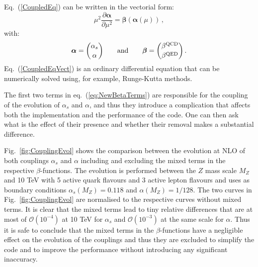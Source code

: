 Eq.~(\ref{CoupledEq}) can be written in the vectorial form:
\begin{equation}\label{CoupledEqVect}
\mu^2\frac{\partial {\bm \alpha}}{\partial \mu^2} = {\bm \beta}\left({\bm \alpha}(\mu)\right)\,,
\end{equation}
with:
\begin{equation}
  {\bm \alpha} = {\alpha_s \choose \alpha}\qquad\mbox{and}\qquad  {\bm \beta} = {\beta^{\rm QCD} \choose \beta^{\rm QED}}\,.
\end{equation}
Eq.~(\ref{CoupledEqVect}) is an ordinary differential equation that
can be numerically solved using, for example, Runge-Kutta methods.

The first two terms in eq.~(\ref{eq:NewBetaTerms}) are responsible for
the coupling of the evolution of $\alpha_s$ and $\alpha$, and thus they
introduce a complication that affects both the implementation and the
performance of the code.
%
One can then ask what is the effect of their
presence and whether their removal makes a substantial difference. 

Fig.~\ref{fig:CouplingEvol} shows the comparison between the
evolution at NLO of both couplings $\alpha_s$ and $\alpha$ including
and excluding the mixed terms in the respective
$\beta$-functions.
%
The evolution is performed between the $Z$ mass
scale $M_Z$ and 10 TeV with 5 active quark flavours and 3 active
lepton flavours and uses as boundary conditions
$\alpha_s(M_Z) = 0.118$ and $\alpha(M_Z) = 1/128$.
%
The two curves in
Fig.~\ref{fig:CouplingEvol} are normalised to the respective curves
without mixed terms. It is clear that the mixed terms lead to tiny
relative differences that are at most of $\mathcal{O}(10^{-4})$ at 10
TeV for $\alpha_s$ and $\mathcal{O}(10^{-3})$ at the same scale for
$\alpha$.
%
Thus it is safe to conclude that the mixed terms in the $\beta$-functions
have a negligible effect on the evolution of the couplings and thus they are 
excluded to simplify the code  and to improve the performance
without introducing any significant inaccuracy.

